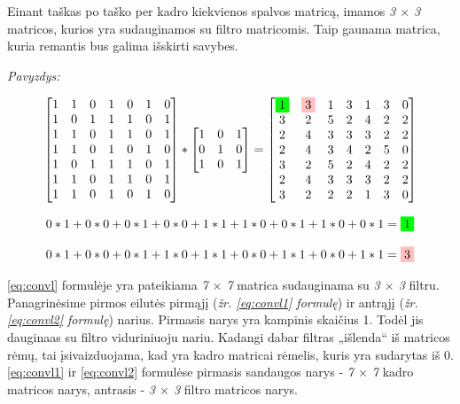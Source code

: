 \documentclass{VUMIFInfKursinis}
\begin{document}
Einant taškas po taško per kadro kiekvienos spalvos matricą, imamos \textit{3 $\times$ 3} matricos, kurios yra sudauginamos su filtro matricomis. Taip gaunama matrica, kuria remantis bus galima išskirti savybes.

\textit{Pavyzdys:}

\begin{equation}\label{eq:convl}
	\begin{bmatrix}
	1 & 1 & 0 & 1 & 0 & 1 & 0 \\
	1 & 0 & 1 & 1 & 1 & 0 & 1 \\
	1 & 1 & 0 & 1 & 1 & 0 & 1 \\
	1 & 1 & 0 & 1 & 0 & 1 & 0 \\
	1 & 0 & 1 & 1 & 1 & 0 & 1 \\
	1 & 1 & 0 & 1 & 1 & 0 & 1 \\
	1 & 1 & 0 & 1 & 0 & 1 & 0
	\end{bmatrix}
	*
	\begin{bmatrix}
	1 & 0 & 1 \\
	0 & 1 & 0 \\
	1 & 0 & 1
	\end{bmatrix}
	=
	\begin{bmatrix}
	\colorbox{green}{1} & \colorbox{pink}{3} & 1 & 3 & 1 & 3 & 0 \\
	3 & 2 & 5 & 2 & 4 & 2 & 2 \\
	2 & 4 & 3 & 3 & 3 & 2 & 2 \\
	2 & 4 & 3 & 4 & 2 & 5 & 0 \\
	3 & 2 & 5 & 2 & 4 & 2 & 2 \\
	2 & 4 & 3 & 3 & 3 & 2 & 2 \\
	3 & 2 & 2 & 2 & 1 & 3 & 0
	\end{bmatrix}
\end{equation}

\begin{equation}\label{eq:convl1}
	0*1+0*0+0*1+0*0+1*1+1*0+0*1+1*0+0*1=\colorbox{green}{1}
\end{equation}


\begin{equation}\label{eq:convl2}
	0*1+0*0+0*1+1*0+1*1+0*0+1*1+0*0+1*1=\colorbox{pink}{3}
\end{equation}

\ref{eq:convl} formulėje yra pateikiama \textit{7 $\times$ 7} matrica sudauginama su \textit{3 $\times$ 3} filtru. Panagrinėsime pirmos eilutės pirmąjį (\textit{žr. \ref{eq:convl1} formulę}) ir antrąjį (\textit{žr. \ref{eq:convl2} formulę}) narius. Pirmasis narys yra kampinis skaičius 1. Todėl jis dauginaas su filtro viduriniuoju nariu. Kadangi dabar filtras „išlenda“ iš matricos rėmų, tai įsivaizduojama, kad yra kadro matricai rėmelis, kuris yra sudarytas iš 0. \ref{eq:convl1} ir \ref{eq:convl2} formulėse pirmasis sandaugos narys - \textit{7 $\times$ 7} kadro matricos narys, antrasis - \textit{3 $\times$ 3} filtro matricos narys.
\end{document}
